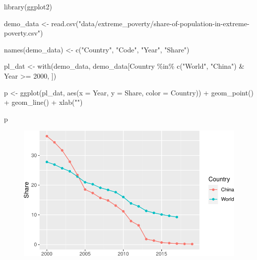 \documentclass[
  letterpaper,
]{scrbook}
\newenvironment{Shaded}{\begin{snugshade}}{\end{snugshade}}
\newcommand{\AttributeTok}[1]{\textcolor[rgb]{0.40,0.45,0.13}{#1}}
\newcommand{\DecValTok}[1]{\textcolor[rgb]{0.68,0.00,0.00}{#1}}
\newcommand{\FunctionTok}[1]{\textcolor[rgb]{0.28,0.35,0.67}{#1}}
\newcommand{\NormalTok}[1]{\textcolor[rgb]{0.00,0.23,0.31}{#1}}
\newcommand{\OtherTok}[1]{\textcolor[rgb]{0.00,0.23,0.31}{#1}}
\newcommand{\SpecialCharTok}[1]{\textcolor[rgb]{0.37,0.37,0.37}{#1}}
\newcommand{\StringTok}[1]{\textcolor[rgb]{0.13,0.47,0.30}{#1}}
\begin{document}
\begin{Shaded}
\begin{Highlighting}[]
\FunctionTok{library}\NormalTok{(ggplot2)}

\NormalTok{demo\_data }\OtherTok{\textless{}{-}} \FunctionTok{read.csv}\NormalTok{(}\StringTok{"data/extreme\_poverty/share{-}of{-}population{-}in{-}extreme{-}poverty.csv"}\NormalTok{)}

\FunctionTok{names}\NormalTok{(demo\_data) }\OtherTok{\textless{}{-}} \FunctionTok{c}\NormalTok{(}\StringTok{"Country"}\NormalTok{, }\StringTok{"Code"}\NormalTok{, }\StringTok{"Year"}\NormalTok{, }\StringTok{"Share"}\NormalTok{)}

\NormalTok{pl\_dat }\OtherTok{\textless{}{-}} \FunctionTok{with}\NormalTok{(demo\_data, demo\_data[Country }\SpecialCharTok{\%in\%} \FunctionTok{c}\NormalTok{(}\StringTok{"World"}\NormalTok{, }\StringTok{"China"}\NormalTok{) }\SpecialCharTok{\&}\NormalTok{ Year }\SpecialCharTok{\textgreater{}=} \DecValTok{2000}\NormalTok{, ])}

\NormalTok{p }\OtherTok{\textless{}{-}} \FunctionTok{ggplot}\NormalTok{(pl\_dat, }\FunctionTok{aes}\NormalTok{(}\AttributeTok{x =}\NormalTok{ Year, }\AttributeTok{y =}\NormalTok{ Share, }\AttributeTok{color =}\NormalTok{ Country)) }\SpecialCharTok{+}
     \FunctionTok{geom\_point}\NormalTok{() }\SpecialCharTok{+}
     \FunctionTok{geom\_line}\NormalTok{() }\SpecialCharTok{+}
     \FunctionTok{xlab}\NormalTok{(}\StringTok{""}\NormalTok{)}

\NormalTok{p}
\end{Highlighting}
\end{Shaded}

\begin{figure}[H]

{\centering \includegraphics{./introduction_files/figure-pdf/unnamed-chunk-7-1.pdf}

}

\end{figure}
\end{document}

